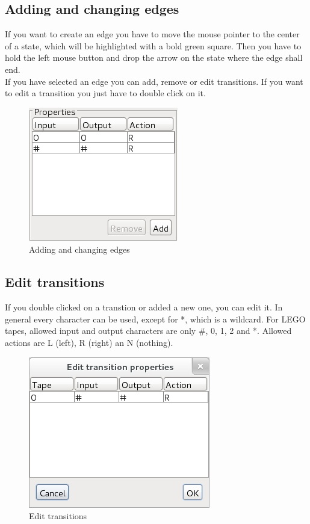 \documentclass[%
  a4paper,%
  11pt,%
  blue,%
  hyperref	%
  ]{tubsartcl}
\begin{document}
\clearpage

\subsection{Adding and changing edges}
\label{sec:adding-chang-edges}
If you want to create an edge you have to move the mouse pointer to the center of a state, which will be highlighted with a bold green square. Then you have to hold the left mouse button and drop the arrow on the state where the edge shall end. \\
If you have selected an edge you can add, remove or edit transitions. If you want to edit a transition you just have to double click on it.
\begin{figure}[!htb]
\begin{center}
\includegraphics[scale=0.5]{graphics_gui/edge_properties.png}
\end{center}
\caption{Adding and changing edges}
\label{pic:edge_properties}
\end{figure}

\subsection{Edit transitions}
\label{sec:edit-transitions}
If you double clicked on a transtion or added a new one, you can edit it. In general every character can be used, except for *, which is a wildcard. For LEGO tapes, allowed input and output characters are only \#, 0, 1, 2 and *. Allowed actions are L (left), R (right) an N (nothing).
\begin{figure}[!htb]
\begin{center}
\includegraphics[scale=0.5]{graphics_gui/edit_transitions.png}
\end{center}
\caption{Edit transitions}
\label{pic:edit_transitions}
\end{figure}
\end{document}
